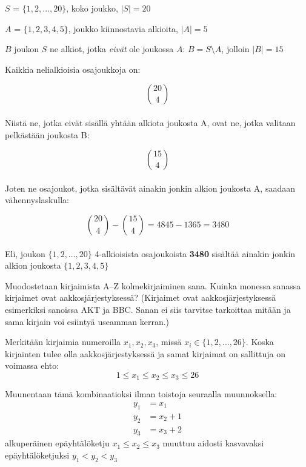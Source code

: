 \documentclass[12pt,a4paper]{article}
\begin{document}
\begin{kuvaus}
  \item $S$ = $\{1,2,\ldots,20\}$, koko joukko, $|S| = 20$
  \item $A$ = $\{1, 2, 3, 4, 5\}$, joukko kiinnostavia alkioita, $|A| = 5$
  \item $B$ joukon $S$ ne alkiot, jotka \emph{eivät} ole joukossa
  $A$: $B = S \setminus A$, jolloin $|B| = 15$
\end{kuvaus}

Kaikkia nelialkioisia osajoukkoja on:

\[
\binom{20}{4}
\]
\\
Niistä ne, jotka eivät sisällä yhtään alkiota joukosta A,
ovat ne, jotka valitaan pelkästään joukosta B:

\[
\binom{15}{4}
\]
\\
Joten ne osajoukot, jotka sisältävät ainakin jonkin alkion joukosta
A, saadaan vähennyslaskulla:

\[
\binom{20}{4} - \binom{15}{4} = 4845 - 1365 = 3480
\]
\\
Eli, joukon $\{1,2,\ldots,20\}$ 4-alkioisista osajoukoista \textbf{3480} sisältää ainakin jonkin alkion joukosta $\{1, 2, 3, 4, 5\}$








\newpage
{}

Muodostetaan kirjaimista A--Z kolmekirjaiminen sana. Kuinka monessa sanassa kirjaimet ovat aakkosjärjestyksessä? (Kirjaimet ovat aakkosjärjestyksessä esimerkiksi sanoissa AKT ja BBC. Sanan ei siis tarvitse tarkoittaa mitään ja sama kirjain voi esiintyä useamman kerran.)

\vspace{0.4cm}

Merkitään kirjaimia numeroilla $x_1, x_2, x_3$, missä $x_i \in \{1, 2, \ldots, 26\}$.
Koska kirjainten tulee olla aakkosjärjestyksessä ja samat kirjaimat on sallittuja on voimassa ehto:
\[
1 \le x_1 \le x_2 \le x_3 \le 26
\]

Muunentaan tämä kombinaatioksi ilman toistoja seuraalla muunnoksella:
\begin{align*}
y_1 &= x_1 \\
y_2 &= x_2 + 1 \\
y_3 &= x_3 + 2
\end{align*}
alkuperäinen epäyhtälöketju $x_1 \le x_2 \le x_3$ muuttuu aidosti kasvavaksi epäyhtälöketjuksi $y_1 < y_2 < y_3$\\
\end{document}
